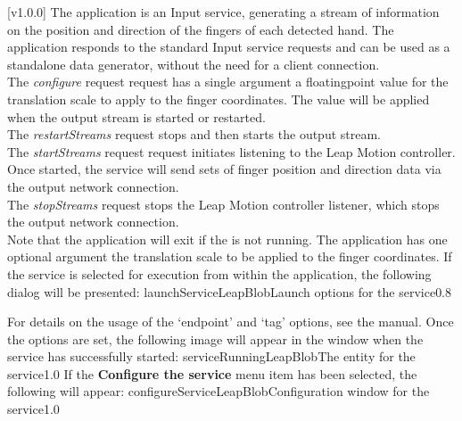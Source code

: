 [v1.0.0]
The  application is an Input service,
generating a stream of information on the position and direction of the fingers of each
detected hand.
The application responds to the standard Input service requests and can be used as a
standalone data generator, without the need for a client connection.\\

The \emph{configure} request request has a single argument \longDash{} a
floating\longDash{}point value for the translation scale to apply to the finger
coordinates.
The value will be applied when the output stream is started or restarted.\\ 

The \emph{restartStreams} request stops and then starts the output stream.\\

The \emph{startStreams} request request initiates listening to the Leap Motion controller.
Once started, the service will send sets of finger position and direction data via the
output \yarp{} network connection.\\

The \emph{stopStreams} request stops the Leap Motion controller listener, which stops the
output \yarp{} network connection.\\ 

Note that the application will exit if the \emph{\RS} is not running.
The application has one optional argument \longDash{} the translation scale to be applied
to the finger coordinates.
\insertAppParameters
\insertTagDescription{\LBI}
\insertInputServiceComment
\condPage
\insertStandardServiceCommands
\secondaryEnd
\condPage
{}
If the service is selected for execution from within the \emph{\MMMU} application, the
following dialog will be presented:
%
{launchServiceLeapBlob}{Launch options for the \emph{\LBI} service}{0.8}

For details on the usage of the `endpoint' and `tag' options, see the \emph{\MMMU} manual.
Once the options are set, the following image will appear in the \emph{\MMMU} window when
the service has successfully started:
%
{serviceRunningLeapBlob}{The \emph{\MMMU} entity for the \emph{\LBI} service}{1.0}
\condPage{}
If the \textbf{Configure the service} menu item has been selected, the following will
appear:
%
{configureServiceLeapBlob}{Configuration window for the \emph{\LBI} service}{1.0}
\secondaryEnd
\primaryEnd{}
